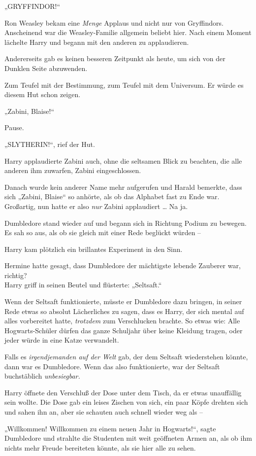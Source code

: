 {„GRYFFINDOR!“

Ron Weasley bekam eine \emph{Menge} Applaus und nicht nur von Gryffindors. Anscheinend war die Weasley-Familie allgemein beliebt hier. Nach einem Moment lächelte Harry und begann mit den anderen zu applaudieren.

Andererseits gab es keinen besseren Zeitpunkt als heute, um sich von der Dunklen Seite abzuwenden.

Zum Teufel mit der Bestimmung, zum Teufel mit dem Universum. Er würde es diesem Hut schon zeigen.

„Zabini, Blaise!“

Pause.

„SLYTHERIN!“, rief der Hut.

Harry applaudierte Zabini auch, ohne die seltsamen Blick zu beachten, die alle anderen ihm zuwarfen, Zabini eingeschlossen.

Danach wurde kein anderer Name mehr aufgerufen und Harald bemerkte, dass sich „Zabini, Blaise“ so anhörte, als ob das Alphabet fast zu Ende war. Großartig, nun hatte er also \emph{nur} Zabini applaudiert … Na ja.

Dumbledore stand wieder auf und begann sich in Richtung Podium zu bewegen. Es sah so aus, als ob sie gleich mit einer Rede beglückt würden --

Harry kam plötzlich ein brillantes Experiment in den Sinn.

Hermine hatte gesagt, dass Dumbledore der mächtigste lebende Zauberer war, richtig?\\ Harry griff in seinen Beutel und flüsterte: „Seltsaft.“

Wenn der Seltsaft funktionierte, müsste er Dumbledore dazu bringen, in seiner Rede etwas so absolut Lächerliches zu sagen, dass es Harry, der sich mental auf alles vorbereitet hatte, \emph{trotzdem} zum Verschlucken brachte. So etwas wie: Alle Hogwarts-Schüler dürfen das ganze Schuljahr über keine Kleidung tragen, oder jeder würde in eine Katze verwandelt.

Falls es \emph{irgendjemanden auf der Welt} gab, der dem Seltsaft wiederstehen könnte, dann war es Dumbledore. Wenn das also funktionierte, war der Seltsaft buchstäblich \emph{unbesiegbar.}

Harry öffnete den Verschluß der Dose unter dem Tisch, da er etwas unauffällig sein wollte. Die Dose gab ein leises Zischen von sich, ein paar Köpfe drehten sich und sahen ihn an, aber sie schauten auch schnell wieder weg als --

„Willkommen! Willkommen zu einem neuen Jahr in Hogwarts!“, sagte Dumbledore und strahlte die Studenten mit weit geöffneten Armen an, als ob ihm nichts mehr Freude bereiteten könnte, als sie hier alle zu sehen.

}
